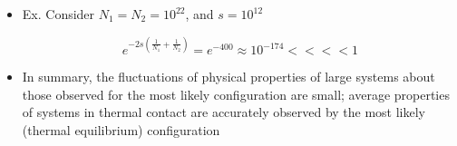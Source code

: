 \begin{itemize}
\begin{itemize}
      \item Ex. Consider $N_1=N_2=10^{22}$, and $s=10^{12}$


        $$e^{-2s\left( \frac{1}{N_1}+\frac{1}{N_2} \right)}=e^{-400}\approx 10^{-174}<<<< 1$$

      \item In summary, the fluctuations of physical properties of large systems about those observed for the most likely configuration are small; average properties of systems in thermal contact are accurately observed by the most likely (thermal equilibrium) configuration

    \end{itemize}

\end{itemize}



